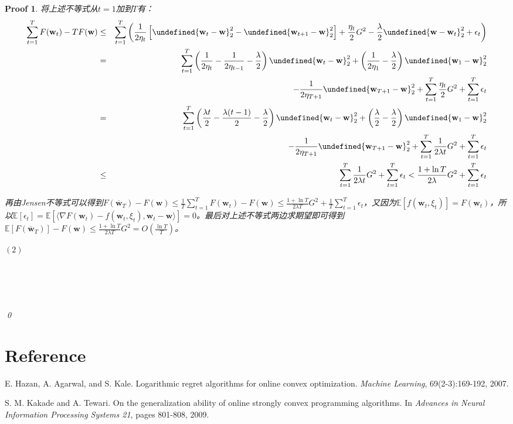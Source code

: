 \documentclass[a4paper,UTF8]{article}
\let\norm\undefined %
\DeclarePairedDelimiter\norm{\lVert}{\rVert}
\numberwithin{equation}{section}
\newtheorem*{myProof}{Proof}
\begin{document}
\begin{myProof}
将上述不等式从$t=1$加到$T$有：
\begin{eqnarray*}
\sum_{t=1}^T F(\mathbf{w}_t) - TF(\mathbf{w}) &\le& \sum_{t=1}^T \left( \frac{1}{2\eta_t} \left[ \norm{\mathbf{w}_t - \mathbf{w}}_2^2 - \norm{\mathbf{w}_{t+1} - \mathbf{w}}_2^2 \right] + \frac{\eta_t}{2} G^2 - \frac{\lambda}{2} \norm{\mathbf{w} - \mathbf{w}_t}_2^2 + \epsilon_t \right) \\
&=& \sum_{t=1}^T \left( \frac{1}{2\eta_t} - \frac{1}{2\eta_{t-1}} - \frac{\lambda}{2} \right) \norm{\mathbf{w}_t - \mathbf{w}}_2^2 + \left( \frac{1}{2\eta_1} - \frac{\lambda}{2} \right) \norm{\mathbf{w}_1 - \mathbf{w}}_2^2 \\
&& - \frac{1}{2\eta_{T+1}}\norm{\mathbf{w}_{T+1} - \mathbf{w}}_2^2 + \sum_{t=1}^T \frac{\eta_t}{2} G^2 + \sum_{t=1}^T \epsilon_t \\
&=&  \sum_{t=1}^T \left( \frac{\lambda t}{2} - \frac{\lambda (t-1)}{2} - \frac{\lambda}{2} \right) \norm{\mathbf{w}_t - \mathbf{w}}_2^2 + \left( \frac{\lambda}{2} - \frac{\lambda}{2} \right) \norm{\mathbf{w}_1 - \mathbf{w}}_2^2 \\
&& - \frac{1}{2\eta_{T+1}}\norm{\mathbf{w}_{T+1} - \mathbf{w}}_2^2 + \sum_{t=1}^T \frac{1}{2\lambda t} G^2 + \sum_{t=1}^T \epsilon_t \\
&\le& \sum_{t=1}^T \frac{1}{2\lambda t} G^2 + \sum_{t=1}^T \epsilon_t < \frac{1 + \ln T}{2\lambda} G^2 + \sum_{t=1}^T \epsilon_t
\end{eqnarray*}

再由Jensen不等式可以得到$F(\overline{\mathbf{w}}_T) - F(\mathbf{w}) \le \frac{1}{T}\sum_{t=1}^T F(\mathbf{w}_t) - F(\mathbf{w}) \le \frac{1 + \ln T}{2\lambda T} G^2 + \frac{1}{T}\sum_{t=1}^T \epsilon_t$，又因为$\mathbb{E}[f(\mathbf{w}_t, \xi_t)] = F(\mathbf{w}_t)$，所以$\mathbb{E}[\epsilon_t] = \mathbb{E}[\langle \nabla F(\mathbf{w}_t) - f(\mathbf{w}_t, \xi_t) , \mathbf{w}_t - \mathbf{w} \rangle] = 0$。最后对上述不等式两边求期望即可得到$\mathbb{E}[F(\overline{\mathbf{w}}_T)] - F(\mathbf{w}) \le \frac{1 + \ln T}{2\lambda T} G^2 = O(\frac{\ln T}{T})$。

$(2)$ 

	~\\
	~\\
	~\\
	~\\	
	\qed
\end{myProof}
\newpage
\section*{Reference}
\begin{enumerate}[ {[}1{]}]
\item E. Hazan, A. Agarwal, and S. Kale. Logarithmic regret algorithms for online convex optimization. \textit{Machine Learning}, 69(2-3):169-192, 2007.
\item S. M. Kakade and A. Tewari. On the generalization ability of online strongly convex programming algorithms. In \textit{Advances in Neural Information Processing Systems 21}, pages 801-808, 2009.
\end{enumerate}
\end{document}

